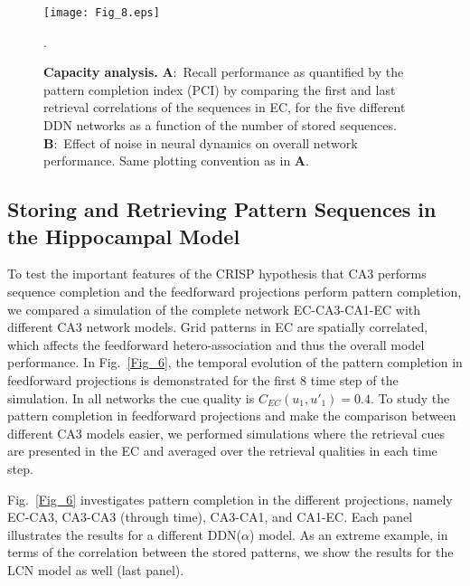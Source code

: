 \documentclass[utf8]{frontiersSCNS} %
\begin{document}
\begin{figure}[!htb]
\centering\texttt{[image: Fig\_8.eps]}
\caption{\textbf{Capacity analysis.} 
\textbf{A}:~Recall performance as quantified by the pattern completion index (PCI) by comparing the first and last retrieval correlations of the sequences in EC, for the five different DDN networks as a function of the number of stored sequences. 
\textbf{B}:~Effect of noise in neural dynamics on overall network performance.
Same plotting convention as in \textbf{A}.
}.   
\label{Fig_8}
\end{figure}


\subsection{Storing and Retrieving Pattern Sequences in the Hippocampal Model}




To test the important features of the CRISP hypothesis that CA3 performs sequence completion and the feedforward projections perform pattern completion, we compared a simulation of the complete network EC-CA3-CA1-EC with different CA3 network models. Grid patterns in EC are spatially correlated, which affects the feedforward hetero-association and thus the overall model performance. In Fig.~\ref{Fig_6}, the temporal evolution of the pattern completion in feedforward projections is demonstrated for the first 8 time step of the simulation. In all networks the cue quality is $C_{EC}(u_1, u'_1) = 0.4$. 
To study the pattern completion in feedforward projections and make the comparison between different CA3 models easier, we performed simulations where the retrieval cues are presented in the EC and averaged over the retrieval qualities in each time step.

Fig.~\ref{Fig_6} investigates pattern completion in the different projections, namely EC-CA3, CA3-CA3 (through time), CA3-CA1, and CA1-EC.
Each panel illustrates the results for a different DDN($\alpha$) model. As an extreme example, in terms of the correlation between the stored patterns, we show the results for the LCN model as well (last panel). 
\end{document}

